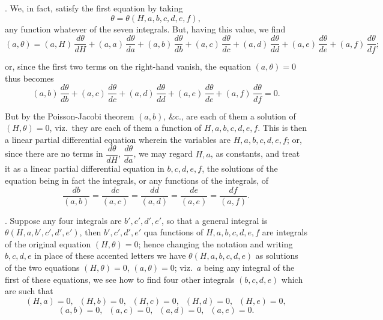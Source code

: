 \documentclass[11pt,a4paper]{article}
\begin{document}
\medskip

. We, in fact, satisfy the first equation by taking
\[
\theta = \theta(H, a, b, c, d, e, f),
\]
any function whatever of the seven integrals. But, having this value, we find
\[
(a, \theta) = (a, H)\,\frac{d\theta}{dH} + (a, a)\,\frac{d\theta}{da} + (a, b)\,\frac{d\theta}{db} + (a, c)\,\frac{d\theta}{dc} + (a, d)\,\frac{d\theta}{dd} + (a, e)\,\frac{d\theta}{de} + (a, f)\,\frac{d\theta}{df};
\]

\newpage


or, since the first two terms on the right-hand vanish, the equation $(a, \theta) = 0$ thus becomes
\[
(a, b)\,\frac{d\theta}{db} + (a, c)\,\frac{d\theta}{dc} + (a, d)\,\frac{d\theta}{dd} + (a, e)\,\frac{d\theta}{de} + (a, f)\,\frac{d\theta}{df} = 0.
\]

But by the Poisson-Jacobi theorem $(a, b)$, \&c., are each of them a solution of $(H, \theta) = 0$, viz.\ they are each of them a function of $H, a, b, c, d, e, f$. This is then a linear partial differential equation wherein the variables are $H, a, b, c, d, e, f$; or, since there are no terms in $\dfrac{d\theta}{dH}$, $\dfrac{d\theta}{da}$, we may regard $H, a$, as constants, and treat it as a linear partial differential equation in $b, c, d, e, f$, the solutions of the equation being in fact the integrals, or any functions of the integrals, of
\[
\frac{db}{(a, b)} = \frac{dc}{(a, c)} = \frac{dd}{(a, d)} = \frac{de}{(a, e)} = \frac{df}{(a, f)}.
\]

\medskip

. Suppose any four integrals are $b', c', d', e'$, so that a general integral is $\theta(H, a, b', c', d', e')$, then $b', c', d', e'$ qua functions of $H, a, b, c, d, e, f$ are integrals of the original equation $(H, \theta) = 0$; hence changing the notation and writing $b, c, d, e$ in place of these accented letters we have $\theta(H, a, b, c, d, e)$ as solutions of the two equations $(H, \theta) = 0$, $(a, \theta) = 0$; viz.\ $a$ being any integral of the first of these equations, we see how to find four other integrals $(b, c, d, e)$ which are such that
\[
(H, a) = 0, \;\; (H, b) = 0, \;\; (H, c) = 0, \;\; (H, d) = 0, \;\; (H, e) = 0,
\]
\[
(a, b) = 0, \;\; (a, c) = 0, \;\; (a, d) = 0, \;\; (a, e) = 0.
\]

\medskip
\end{document}
